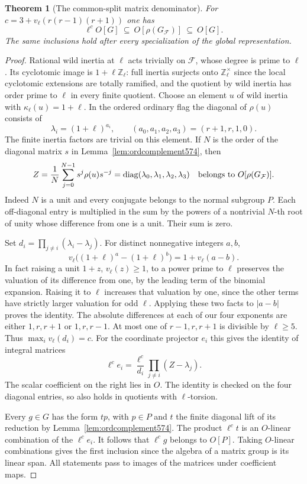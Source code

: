 \documentclass[a4paper,11pt]{article}
\newtheorem{theorem}[proposition]{Theorem}
\theoremstyle{definition}
\theoremstyle{remark}
\newcommand{\ZZ}{\mathbb Z}\newcommand{\ord}{\operatorname{ord}}
\numberwithin{equation}{section}
\begin{document}
\begin{theorem}[The common-split matrix denominator]
\leavevmode\label{thm:matrixden574}
For \(c=3+v_\ell(r(r-1)(r+1))\) one has
\[
        \ell^c O[G]\ \subseteq\
             O[\rho(G_{\mathcal F})]\ \subseteq\ O[G] .
\]
The same inclusions hold after every specialization of the
global representation.
\end{theorem}
\begin{proof}
Rational wild inertia at \(\ell\) acts trivially on
\(\mathcal F\), whose degree is prime to \(\ell\).
Its cyclotomic image is \(1+\ell\ZZ_\ell\): full inertia
surjects onto \(\ZZ_\ell^\times\) since the local cyclotomic
extensions are totally ramified, and the quotient by wild
inertia has order prime to \(\ell\) in every finite quotient.
Choose an element \(u\) of wild inertia with
\(\kappa_\ell(u)=1+\ell\). In the ordered ordinary flag
the diagonal of \(\rho(u)\) consists of
\[
     \lambda_i=(1+\ell)^{a_i},\qquad
                   (a_0,a_1,a_2,a_3)=(r+1,r,1,0).
\]
The finite inertia factors are trivial on this element.
If \(N\) is the order of the diagonal matrix \(s\) in
Lemma~\ref{lem:ordcomplement574}, then
\[
         Z=\frac1N\sum_{j=0}^{N-1}s^j\rho(u)s^{-j}
            =\operatorname{diag}(\lambda_0,\lambda_1,
                                             \lambda_2,\lambda_3)
              \quad\hbox{belongs to }O[\rho(G_{\mathcal F})].
\]
Indeed \(N\) is a unit and every conjugate belongs to the
normal subgroup \(P\). Each off-diagonal entry is multiplied
in the sum by the powers of a nontrivial \(N\)-th root of
unity whose difference from one is a unit. Their sum is zero.

Set \(d_i=\prod_{j\ne i}(\lambda_i-\lambda_j)\). For
distinct nonnegative integers \(a,b\),
\[
  v_\ell\big((1+\ell)^a-(1+\ell)^b\big)=1+v_\ell(a-b).
\]
In fact raising a unit \(1+z\), \(v_\ell(z)\ge1\), to
a power prime to \(\ell\) preserves the valuation of its
difference from one, by the leading term of the binomial
expansion. Raising it to \(\ell\) increases that valuation
by one, since the other terms have strictly larger
valuation for odd \(\ell\). Applying these two facts to
\(|a-b|\) proves the identity. The absolute differences
at each of our four exponents are either \(1,r,r+1\) or
\(1,r,r-1\). At most one of \(r-1,r,r+1\) is divisible
by \(\ell\ge5\). Thus \(\max_i v_\ell(d_i)=c\).
For the coordinate projector \(e_i\) this gives the identity
of integral matrices
\[
        \ell^c e_i=\frac{\ell^c}{d_i}
                            \prod_{j\ne i}(Z-\lambda_j).
\]
The scalar coefficient on the right lies in \(O\).
The identity is checked on the four diagonal entries,
so also holds in quotients with \(\ell\)-torsion.

Every \(g\in G\) has the form \(t p\), with \(p\in P\)
and \(t\) the finite diagonal lift of its reduction by
Lemma~\ref{lem:ordcomplement574}. The product \(\ell^c t\)
is an \(O\)-linear combination of the \(\ell^c e_i\).
It follows that \(\ell^c g\) belongs to \(O[P]\).
Taking \(O\)-linear combinations gives the first inclusion
since the algebra of a matrix group is its linear span.
All statements pass to images of the matrices under
coefficient maps.
\end{proof}
\end{document}
